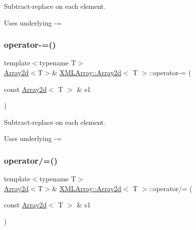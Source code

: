 Subtract-\/replace on each element. 

Uses underlying -\/= \mbox{\label{classXMLArray_1_1Array2d_aaeb259530dba3f189e129c935391d92a}} 
\subsubsection{\texorpdfstring{operator-\/=()}{operator-=()}\hspace{0.1cm}{\footnotesize\ttfamily [2/2]}}
{\footnotesize\ttfamily template$<$typename T$>$ \\
\mbox{\hyperlink{classXMLArray_1_1Array2d}{Array2d}}$<$T$>$\& \mbox{\hyperlink{classXMLArray_1_1Array2d}{X\+M\+L\+Array\+::\+Array2d}}$<$ T $>$\+::operator-\/= (\begin{DoxyParamCaption}\item[{const \mbox{\hyperlink{classXMLArray_1_1Array2d}{Array2d}}$<$ T $>$ \&}]{s1 }\end{DoxyParamCaption})\hspace{0.3cm}{\ttfamily [inline]}}



Subtract-\/replace on each element. 

Uses underlying -\/= \mbox{\label{classXMLArray_1_1Array2d_a704df3d7442ab68977e0caa8f8f059cd}} 
\subsubsection{\texorpdfstring{operator/=()}{operator/=()}\hspace{0.1cm}{\footnotesize\ttfamily [1/4]}}
{\footnotesize\ttfamily template$<$typename T$>$ \\
\mbox{\hyperlink{classXMLArray_1_1Array2d}{Array2d}}$<$T$>$\& \mbox{\hyperlink{classXMLArray_1_1Array2d}{X\+M\+L\+Array\+::\+Array2d}}$<$ T $>$\+::operator/= (\begin{DoxyParamCaption}\item[{const \mbox{\hyperlink{classXMLArray_1_1Array2d}{Array2d}}$<$ T $>$ \&}]{s1 }\end{DoxyParamCaption})\hspace{0.3cm}{\ttfamily [inline]}}



